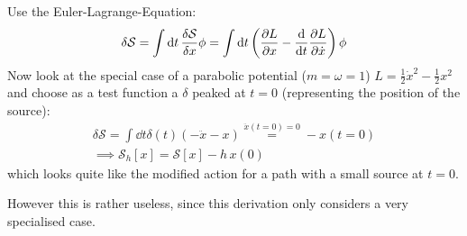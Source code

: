 \documentclass[11pt,a4paper]{scrartcl}
\newcommand{\action}{\ensuremath{\mathcal{S}}}
\begin{document}
Use the Euler-Lagrange-Equation:
\begin{equation*}
    \delta\action=\int\dd{t}\fdv{\action}{x}\phi=\int\dd{t}\left(\pdv{L}{x}-\dv{t}\pdv{L}{\dot{x}}\right)\phi
\end{equation*}
Now look at the special case of a parabolic potential ($m=\omega=1$)
$L=\frac{1}{2}\dot{x}^2-\frac{1}{2}x^2$ and choose as a test function a
$\delta$ peaked at $t=0$ (representing the position of the source):
\begin{gather*}
    \delta\action=\int\dd{t}\delta(t)\left(-\ddot{x}-x\right)
    \overset{\ddot{x}(t=0)=0}{=}-x(t=0) \\
    \implies \action_h[x]=\action[x]-h\,x(0)
\end{gather*}
which looks quite like the modified action for a path with a small source at
$t=0$.

\vspace*{\baselineskip}

However this is rather useless, since this derivation only considers a
very specialised case.
\end{document}
